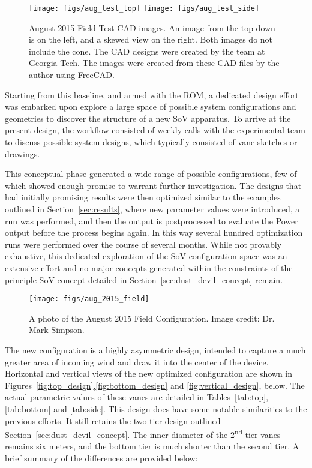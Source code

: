  \begin{figure}
   \centering
   \texttt{[image: figs/aug\_test\_top]}
   \hfill
   \texttt{[image: figs/aug\_test\_side]}
   \caption{August 2015 Field Test CAD images. An image from the top
   down is on the left, and a skewed view on the right. Both images do
   not include the cone. The CAD designs were created by the team at
   Georgia Tech. The images were created from these CAD files by the
   author using FreeCAD\cite{Falck}.}  
   \label{fig:cad_aug_2015}
  \end{figure}

Starting from this baseline, and armed with the ROM, a dedicated design
effort was embarked upon explore a large space of possible system
configurations and geometries to discover the structure of a new SoV
apparatus. To arrive at the present design, the workflow consisted of
weekly calls with the experimental team to discuss possible system
designs, which typically consisted of vane sketches or drawings. 

This conceptual phase generated a wide range of possible
configurations, few of which showed enough promise to warrant further
investigation. The designs that had initially promising results were
then optimized similar to the examples outlined in
Section~\ref{sec:results}, where new parameter values were introduced, a
run was performed, and then the output is postprocessed to evaluate the
Power output before the process begins again. In this way several
hundred optimization runs were performed over the course of several
months. While not provably exhaustive, this dedicated exploration of the 
SoV configuration space was an extensive effort and no major concepts
generated within the constraints of the principle SoV concept detailed
in Section~\ref{sec:dust_devil_concept} remain. 

  \begin{figure}
   \centering
   \texttt{[image: figs/aug\_2015\_field]}
   \caption{A photo of the August 2015 Field Configuration. Image
   credit: Dr. Mark Simpson.}  
   \label{fig:aug_2015_field}
  \end{figure}

The new configuration is a highly asymmetric design, intended to capture
a much greater area of incoming wind and draw it into the center of the
device. Horizontal and vertical views of the new optimized configuration
are shown in Figures~\ref{fig:top_design},\ref{fig:bottom_design} and
\ref{fig:vertical_design}, below. The actual parametric values of these
vanes are detailed in Tables~\ref{tab:top},\ref{tab:bottom} and
\ref{tab:side}. This design does have some notable 
similarities to the previous efforts. It still retains the two-tier
design outlined Section~\ref{sec:dust_devil_concept}. The inner diameter 
of the 2\textsuperscript{nd} tier vanes remains six meters, and the
bottom tier is much shorter than the second tier. A brief summary of the
differences are provided below:      


